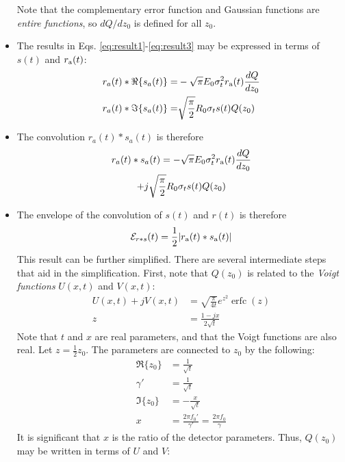 \documentclass[amsmath,amssymb,aps,prd,10pt,twocolumn,showkeys]{revtex4}
\DeclareMathOperator\erfc{erfc}
\begin{document}
\begin{itemize}
\begin{equation}
\end{equation}
Note that the complementary error function and Gaussian functions are \textit{entire functions}, so $dQ/dz_0$ is defined for all $z_0$.
\item The results in Eqs. \ref{eq:result1}-\ref{eq:result3} may be expressed in terms of $s(t)$ and $r_{\rm a}(t)$:
\begin{align}
r_a(t) * \Re\lbrace s_a(t)\rbrace =& -\sqrt{\pi} E_0 \sigma_t^2 r_{\rm a}(t) \frac{dQ}{dz_0} \label{eq:Re} \\
r_a(t) * \Im\lbrace s_a(t)\rbrace =& \sqrt{\frac{\pi}{2}} R_0 \sigma_t s(t) Q(z_0) \label{eq:Im}
\end{align}
\item The convolution $r_a (t) * s_a(t)$ is therefore
\begin{multline}
r_a (t) * s_a(t) = -\sqrt{\pi} E_0 \sigma_t^2 r_{\rm a}(t) \frac{dQ}{dz_0} \\ + j\sqrt{\frac{\pi}{2}} R_0 \sigma_t s(t) Q(z_0)
\end{multline}
\item The envelope of the convolution of $s(t)$ and $r(t)$ is therefore
\begin{equation}
\mathcal{E}_{r * s}(t) = \frac{1}{2}|r_{\rm a}(t) * s_{\rm a}(t)|
\end{equation}
This result can be further simplified.  There are several intermediate steps that aid in the simplification.  First, note that $Q(z_0)$ is related to the \textit{Voigt functions} $U(x,t)$ and $V(x,t)$:
\begin{align}
U(x,t) + j V(x,t) &= \sqrt{\frac{\pi}{4 t}} e^{z^2} \erfc(z) \\
z &= \frac{1-jx}{2\sqrt{t}} \label{eq:z_def}
\end{align}
Note that $t$ and $x$ are real parameters, and that the Voigt functions are also real.  Let $z = \frac{1}{2}z_0$. The parameters are connected to $z_0$ by the following:
\begin{align}
\Re \lbrace z_0 \rbrace &= \frac{1}{\sqrt{t}} \\
\gamma ' &= \frac{1}{\sqrt{t}} \\
\Im \lbrace z_0 \rbrace &= -\frac{x}{\sqrt{t}} \\
x &= \frac{2\pi f_0'}{\gamma'} = \frac{2\pi f_0}{\gamma} \label{eq:x}
\end{align}
It is significant that $x$ is the ratio of the detector parameters.  Thus, $Q(z_0)$ may be written in terms of $U$ and $V$:
\begin{equation}

\end{equation}
\end{itemize}
\end{document}
